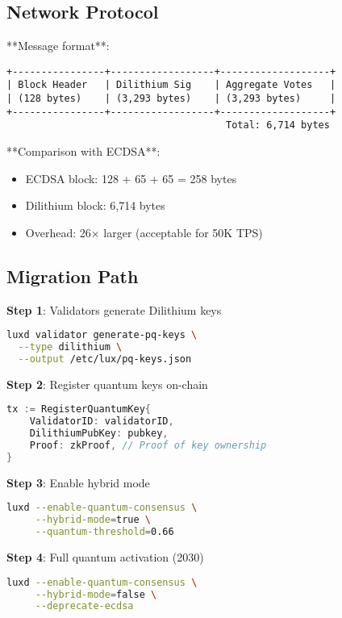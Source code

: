\documentclass[11pt,letterpaper]{article}
\begin{document}
\subsection{Network Protocol}

**Message format**:
\begin{verbatim}
+----------------+------------------+-------------------+
| Block Header   | Dilithium Sig    | Aggregate Votes   |
| (128 bytes)    | (3,293 bytes)    | (3,293 bytes)     |
+----------------+------------------+-------------------+
                                      Total: 6,714 bytes
\end{verbatim}

**Comparison with ECDSA**:
\begin{itemize}
    \item ECDSA block: 128 + 65 + 65 = 258 bytes
    \item Dilithium block: 6,714 bytes
    \item Overhead: 26× larger (acceptable for 50K TPS)
\end{itemize}

\subsection{Migration Path}

\textbf{Step 1}: Validators generate Dilithium keys
\begin{lstlisting}[language=bash]
luxd validator generate-pq-keys \
  --type dilithium \
  --output /etc/lux/pq-keys.json
\end{lstlisting}

\textbf{Step 2}: Register quantum keys on-chain
\begin{lstlisting}[language=Go]
tx := RegisterQuantumKey{
    ValidatorID: validatorID,
    DilithiumPubKey: pubkey,
    Proof: zkProof, // Proof of key ownership
}
\end{lstlisting}

\textbf{Step 3}: Enable hybrid mode
\begin{lstlisting}[language=bash]
luxd --enable-quantum-consensus \
     --hybrid-mode=true \
     --quantum-threshold=0.66
\end{lstlisting}

\textbf{Step 4}: Full quantum activation (2030)
\begin{lstlisting}[language=bash]
luxd --enable-quantum-consensus \
     --hybrid-mode=false \
     --deprecate-ecdsa
\end{lstlisting}
\end{document}

